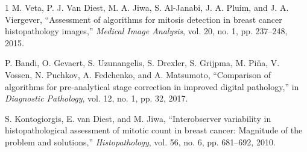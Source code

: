 \documentclass[journal]{IEEEtran}
\begin{document}
\begin{thebibliography}{1}
M. Veta, P. J. Van Diest, M. A. Jiwa, S. Al-Janabi, J. A. Pluim, and J. A. Viergever, ``Assessment of algorithms for mitosis detection in breast cancer histopathology images,'' \textit{Medical Image Analysis}, vol. 20, no. 1, pp. 237--248, 2015.

P. Bandi, O. Gevaert, S. Uzunangelis, S. Drexler, S. Grijpma, M. Piňa, V. Vossen, N. Puchkov, A. Fedchenko, and A. Matsumoto, ``Comparison of algorithms for pre-analytical stage correction in improved digital pathology,'' in \textit{Diagnostic Pathology}, vol. 12, no. 1, pp. 32, 2017.

S. Kontogiorgis, E. van Diest, and M. Jiwa, ``Interobserver variability in histopathological assessment of mitotic count in breast cancer: Magnitude of the problem and solutions,'' \textit{Histopathology}, vol. 56, no. 6, pp. 681--692, 2010.

\end{thebibliography}
\end{document}
